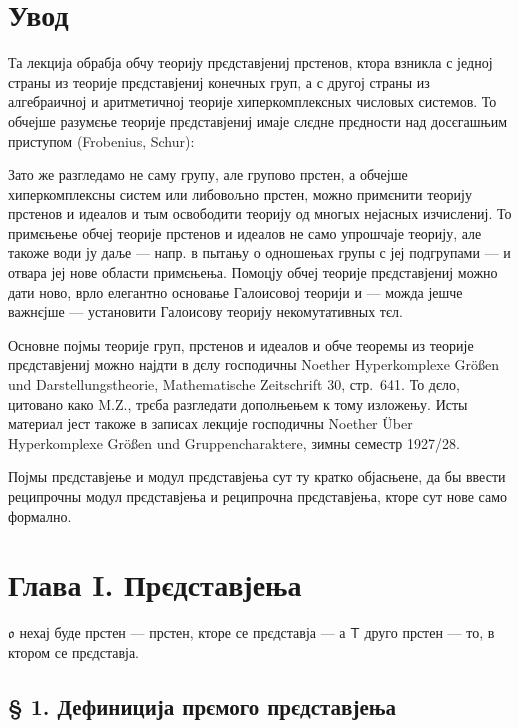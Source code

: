 \documentclass[11pt]{article}
\newcommand{\foreign}[1]{#1}
\begin{document}
\clearpage
\section*{Увод}\label{einleitung}

Та лекција обрабја обчу теорију прєдставјениј прстенов, ктора взникла с
једној страны из теорије прєдставјениј конечных груп, а с другој страны
из алгебраичној и аритметичној теорије хиперкомплексных числовых
системов. То обчејше разумєње теорије прєдставјениј имаје слєдне
прєдности над досєгашњим приступом (\foreign{Frobenius},
\foreign{Schur}):

Зато же разгледамо не саму групу, але групово прстен, а обчејше
хиперкомплексны систем или либовољно прстен, можно примєнити
теорију прстенов и идеалов и тым освободити теорију од многых нејасных
изчислениј. То примєњење обчеј теорије прстенов и идеалов не само
упрошчаје теорију, але такоже води ју даље --- напр. в пытању о
одношењах групы с јеј подгрупами --- и отвара јеј нове области
примєњења. Помоцју обчеј теорије прєдставјениј можно дати ново, врло
елегантно основање Галоисовој теорији и --- можда јешче важнєјше ---
установити Галоисову теорију некомутативных тєл.

Основне појмы теорије груп, прстенов и идеалов и обче теоремы из теорије
прєдставјениј можно најдти в дєлу господичны \foreign{Noether}
\foreign{Hyperkomplexe Größen und Darstellungstheorie},
\foreign{Mathematische Zeitschrift} 30, стр.~641. То дєло, цитовано
како \foreign{M.Z.}, трєба разгледати дополњењем к тому изложењу.
Исты материал јест такоже в записах лекције господичны
\foreign{Noether} \foreign{Über Hyperkomplexe Größen und
Gruppencharaktere}, зимны семестр 1927/28.

Појмы прєдставјење и модул прєдставјења сут ту кратко објасњене,
да бы ввести реципрочны модул прєдставјења и реципрочна
прєдставјења, кторе сут нове само формално.

\section*{Глава I. Прєдставјења}\label{kapitel-i.-darstellungen}

$\mathfrak{o}$ нехај буде прстен --- прстен, кторе се прєдставја --- а
$\mathsf T$ друго прстен --- то, в ктором се прєдставја.

\subsection*{§ 1. Дефиниција прємого прєдставјења}\label{definition-der-direkten-darstellung}
\end{document}
